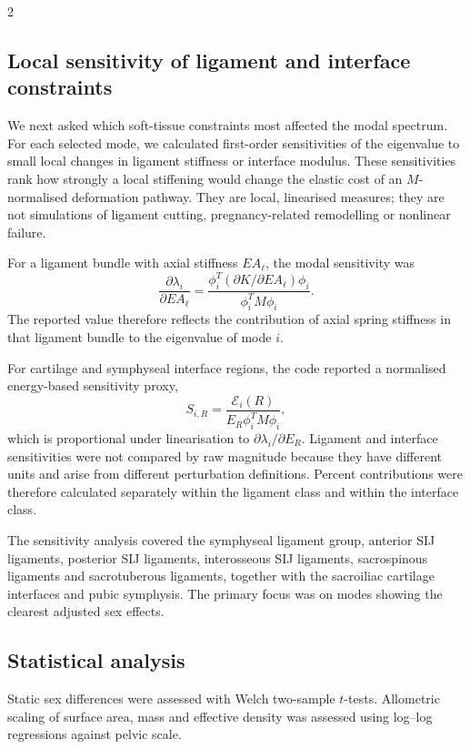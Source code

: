 \documentclass[openacc]{rsproca_new}
\begin{document}
\begin{multicols}{2}
\subsection{Local sensitivity of ligament and interface constraints}

We next asked which soft-tissue constraints most affected the modal spectrum. For each selected mode, we calculated first-order sensitivities of the eigenvalue to small local changes in ligament stiffness or interface modulus. These sensitivities rank how strongly a local stiffening would change the elastic cost of an $M$-normalised deformation pathway. They are local, linearised measures; they are not simulations of ligament cutting, pregnancy-related remodelling or nonlinear failure.

For a ligament bundle with axial stiffness $EA_{\ell}$, the modal sensitivity was
\[
\frac{\partial \lambda_i}{\partial EA_{\ell}} =
\frac{\phi_i^{T}(\partial K/\partial EA_{\ell})\phi_i}
{\phi_i^{T}M\phi_i}.
\]
The reported value therefore reflects the contribution of axial spring stiffness in that ligament bundle to the eigenvalue of mode $i$.

For cartilage and symphyseal interface regions, the code reported a normalised energy-based sensitivity proxy,
\[
S_{i,R} =
\frac{\mathcal{E}_{i}(R)}
{E_R \phi_i^{T}M\phi_i},
\]
which is proportional under linearisation to $\partial \lambda_i/\partial E_R$. Ligament and interface sensitivities were not compared by raw magnitude because they have different units and arise from different perturbation definitions. Percent contributions were therefore calculated separately within the ligament class and within the interface class.

The sensitivity analysis covered the symphyseal ligament group, anterior SIJ ligaments, posterior SIJ ligaments, interosseous SIJ ligaments, sacrospinous ligaments and sacrotuberous ligaments, together with the sacroiliac cartilage interfaces and pubic symphysis. The primary focus was on modes showing the clearest adjusted sex effects.

\subsection{Statistical analysis}

Static sex differences were assessed with Welch two-sample $t$-tests. Allometric scaling of surface area, mass and effective density was assessed using log--log regressions against pelvic scale.


\end{multicols}
\end{document}
